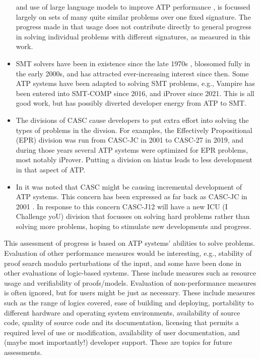 \documentclass[runningheads]{llncs}
\begin{document}
\begin{itemize}
      and use of large language models to improve ATP performance \cite{WX+23,AS+23},
      is focussed largely on sets of many quite similar problems over one fixed signature.
      The progress made in that usage does not contribute directly to general progress in
      solving individual problems with different signatures, as measured in this work.
\item SMT solvers have been in existence since the late 1970s \cite{NO79}, blossomed fully
      in the early 2000s, and has attracted ever-increasing interest since then.
      Some ATP systems have been adapted to solving SMT problems, e.g., Vampire has been entered
      into SMT-COMP since 2016, and iProver since 2021.
      This is all good work, but has possibly diverted developer energy from ATP to SMT.
\item The divisions of CASC cause developers to put extra effort into solving the types of
      problems in the divsion.
      For examples, the Effectively Propositional (EPR) division was run from CASC-JC in 2001 to 
      CASC-27 in 2019, and during those years several ATP systems were optimized for EPR
      problems, most notably iProver.
      Putting a division on hiatus leads to less development in that aspect of ATP.
\item In \cite{SD24-CASC} it was noted that CASC might be causing incremental development of ATP
      systems.
      This concern has been expressed as far back as CASC-JC in 2001 \cite{PSS02}.
      In response to this concern CASC-J12 will have a new ICU (I Challenge yoU) division that
      focusses on solving hard problems rather than solving more problems, hoping to stimulate
      new developments and progress.
\end{itemize}

This assessment of progress is based on ATP systems' abilities to solve problems.
Evaluation of other performance measures would be interesting, e.g., stability of proof search 
modulo perturbations of the input, and some have been done in other evaluations of logic-based 
systems.
These include measures such as resource usage and verifiability of proofs/models.
Evaluation of non-performance measures is often ignored, but for users might be just as
necessary.
These include measures such as 
the range of logics covered, 
ease of building and deploying,
portability to different hardware and operating system environments, 
availability of source code, 
quality of source code and its documentation,
licensing that permits a required level of use or modification, 
availability of user documentation, 
and (maybe most importantly!)
developer support.
These are topics for future assessments.



\end{document}
